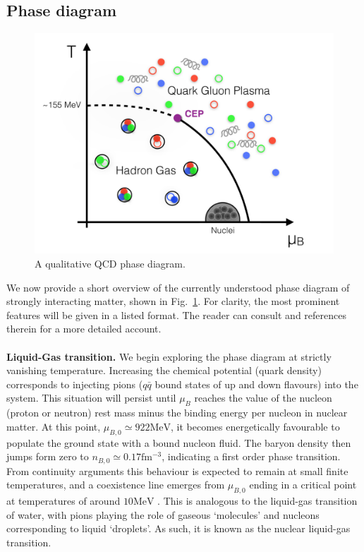 \documentclass[11pt, a4paper, twoside]{book}
\begin{document}
\subsection{Phase diagram}
\label{sec:QCD_phase}
\begin{figure}[t]
	\centering
	\includegraphics[width=\textwidth]{QCDphase}
	\caption{A qualitative QCD phase diagram.}\label{fig:QCDphasediag}
\end{figure}
We now provide a short overview of the currently understood phase diagram of strongly interacting matter, shown in Fig.~\ref{fig:QCDphasediag}. For clarity, the most prominent features will be given in a listed format. The reader can consult \cite{Rischke:2003mt} and references therein for a more detailed account.
\\
\\
\textbf{Liquid-Gas transition.} We begin exploring the phase diagram at strictly vanishing temperature. Increasing the chemical potential (quark density) corresponds to injecting pions (\(q\bar{q}\) bound states of up and down flavours) into the system. This situation will persist until \(\mu_B\) reaches the value of the nucleon (proton or neutron) rest mass minus the binding energy per nucleon in nuclear matter. At this point, \(\mu_{B,0}\simeq 922\mathrm{MeV}\), it becomes energetically favourable to populate the ground state with a bound nucleon fluid. The baryon density then jumps form zero to \(n_{B,0}\simeq 0.17\mathrm{fm^{-3}}\), indicating a first order phase transition. From continuity arguments this behaviour is expected to remain at small finite temperatures, and a coexistence line emerges from \(\mu_{B,0}\) ending in a critical point at temperatures of around \(10\mathrm{MeV}\) \cite{Rischke:2003mt}. This is analogous to the liquid-gas transition of water, with pions playing the role of gaseous `molecules' and nucleons corresponding to liquid `droplets'. As such, it is known as the nuclear liquid-gas transition.\\
\end{document}
